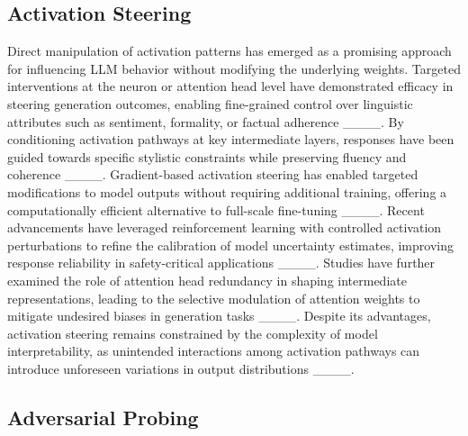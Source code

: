 \subsection{Activation Steering}

Direct manipulation of activation patterns has emerged as a promising approach for influencing LLM behavior without modifying the underlying weights. Targeted interventions at the neuron or attention head level have demonstrated efficacy in steering generation outcomes, enabling fine-grained control over linguistic attributes such as sentiment, formality, or factual adherence ____. By conditioning activation pathways at key intermediate layers, responses have been guided towards specific stylistic constraints while preserving fluency and coherence ____. Gradient-based activation steering has enabled targeted modifications to model outputs without requiring additional training, offering a computationally efficient alternative to full-scale fine-tuning ____. Recent advancements have leveraged reinforcement learning with controlled activation perturbations to refine the calibration of model uncertainty estimates, improving response reliability in safety-critical applications ____. Studies have further examined the role of attention head redundancy in shaping intermediate representations, leading to the selective modulation of attention weights to mitigate undesired biases in generation tasks ____. Despite its advantages, activation steering remains constrained by the complexity of model interpretability, as unintended interactions among activation pathways can introduce unforeseen variations in output distributions ____.

\subsection{Adversarial Probing}

